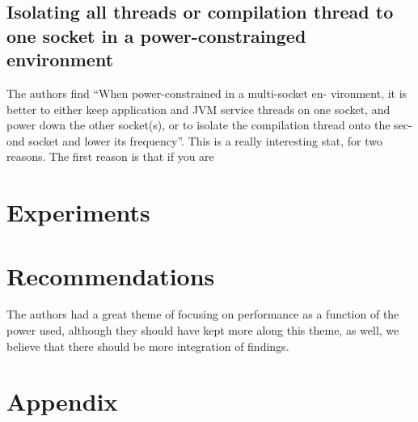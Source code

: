 \documentclass[conference]{IEEEtran}
\begin{document}
\subsection{Isolating all threads or compilation thread to one socket in a power-constrainged environment}

The authors find ``When power-constrained in a multi-socket en- vironment, it is better to either keep application and JVM service threads on one socket, and power down the other socket(s), or to isolate the compilation thread onto the sec- ond socket and lower its frequency''. This is a really interesting stat, for two reasons.  The first reason is that if you are 


\section{Experiments}

\section{Recommendations}
The authors had a great theme of focusing on performance as a function of the power used, although they should have kept more along this theme, as well, we believe that there should be more integration of findings. 

\section{Appendix}

\end{document}
